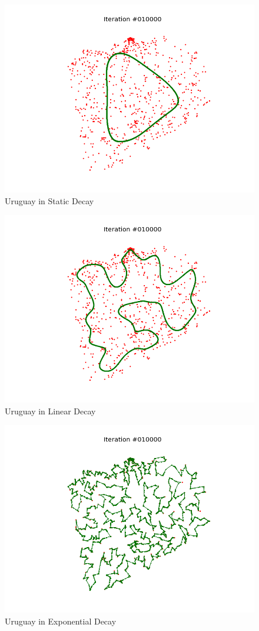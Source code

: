 \documentclass[11pt]{article}
\begin{document}
\begin{figure}[!ht]
  \centering
  \includegraphics[scale=0.6]{u_s.png}
  \caption{Uruguay in Static Decay}
\end{figure}

\begin{figure}[!ht]
  \centering
  \includegraphics[scale=0.6]{u_l.png}
  \caption{Uruguay in Linear Decay}
\end{figure}

\begin{figure}[!ht]
  \centering
  \includegraphics[scale=0.6]{u_e.png}
  \caption{Uruguay in Exponential Decay}
\end{figure}
\end{document}
